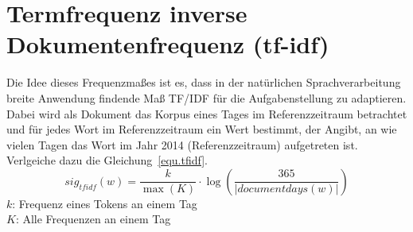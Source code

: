 \section{Termfrequenz inverse Dokumentenfrequenz (tf-idf)}
Die Idee dieses Frequenzmaßes ist es, dass in der natürlichen Sprachverarbeitung breite Anwendung findende Maß TF/IDF für die Aufgabenstellung zu adaptieren. Dabei wird als Dokument das Korpus eines Tages im Referenzzeitraum betrachtet und für jedes Wort im Referenzzeitraum ein Wert bestimmt, der Angibt, an wie vielen Tagen das Wort im Jahr 2014 (Referenzzeitraum) aufgetreten ist. Verlgeiche dazu die Gleichung~\ref{equ.tfidf}.\\
\begin{equation}\label{equ.tfidf}
sig_{tf idf}(w) = \frac{k}{\max(K)} \cdot \log ( \frac{365}{|documentdays(w)|})
\end{equation}
$k$: Frequenz eines Tokens an einem Tag\\
$K$: Alle Frequenzen an einem Tag\\

